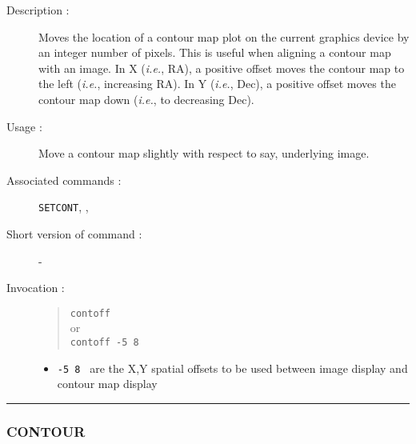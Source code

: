 \begin{description}

\item[Description :] Moves the location of a contour map plot on the
current graphics device by an integer number of pixels.  This is useful
when aligning a contour map with an image.  In X (\emph{i.e.}, RA), a
positive offset moves the contour map to the left (\emph{i.e.},
increasing RA).  In Y (\emph{i.e.}, Dec), a positive offset moves the
contour map down (\emph{i.e.}, to decreasing Dec).

\item[Usage :] Move a contour map slightly with respect to
say, underlying image.

\item[Associated commands :] {\tt {}SETCONT}, 
{\tt {}}, {\tt {}}
\item[Short version of command :] -
\item[Invocation :]

\begin{quote}{\tt  contoff }\\
or \\
{\tt contoff -5 8 }
\end{quote}

\begin{itemize}

\item {\tt -5 8 } are the X,Y spatial offsets to be used between image
display and contour map display
\end{itemize}

\end{description}

\hrule 
\subsubsection*{\label{CONTOUR}CONTOUR}

